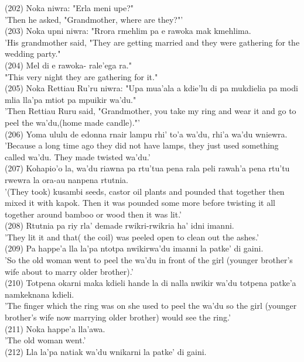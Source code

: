 \documentclass[10pt]{article}
\begin{document}
(202) Noka niwra: "Erla meni upe?"\\
'Then he asked, "Grandmother, where are they?"'\\
(203) Noka upni niwra: "Rrora rmehlim pa e rawoka mak kmehlima.\\
'His grandmother said, "They are getting married and they were gathering for the wedding party."\\
(204) Mel di e rawoka- rale'ega ra."\\
"This very night they are gathering for it."\\
(205) Noka Rettiau Ru'ru niwra: "Upa mua'ala a kdie'lu di pa mukdielia pa modi mlia lla'pa mtiot pa mpuikir wa'du."\\
'Then Rettiau Ruru said, "Grandmother, you take my ring and wear it and go to peel the wa'du,(home made candle)."'\\
(206) Yoma ululu de edonna rnair lampu rhi' to'a wa'du, rhi'a wa'du wniewra.\\
'Because a long time ago they did not have lamps, they just used something called wa'du. They made twisted wa'du.'\\
(207) Kohapio'o la, wa'du riawna pa rtu'tua pena rala peli rawah'a pena rtu'tu rwewra la ora-au nanpena rtutnia.\\
'(They took) kusambi seeds, castor oil plants and pounded that together then mixed it with kapok. Then it was pounded some more before twisting it all together around bamboo or wood then it was lit.'\\
(208) Rtutnia pa riy rla' demade rwikri-rwikria ha' idni imanni.\\
'They lit it and that( the coil) was peeled open to clean out the ashes.'\\
(209) Pa happe'a lla la'pa ntotpa nwikirwa'du imanni la patke' di gaini.\\
'So the old woman went to peel the wa'du in front of the girl (younger brother's wife about to marry older brother).'\\
(210) Totpena okarni maka kdieli hande la di nalla nwikir wa'du totpena patke'a namkeknana kdieli.\\
'The finger which the ring was on she used to peel the wa'du so the girl (younger brother's wife now marrying older brother) would see the ring.'\\
(211) Noka happe'a lla'awa.\\
'The old woman went.'\\
(212) Lla la'pa natiak wa'du wnikarni la patke' di gaini.\\
\end{document}
